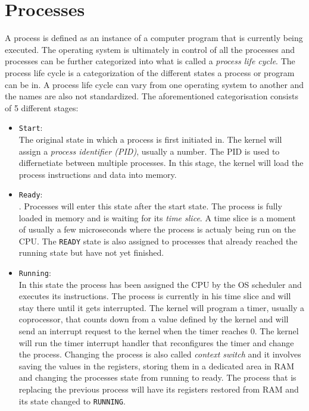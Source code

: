 \section{Processes}

A process is defined as an instance of a computer program that is currently being executed.
The operating system is ultimately in control of all the processes and 
processes can be further categorized into what is called a \textit{process life cycle}. The process life cycle is
a categorization of the different states a process or program can be in. A process life cycle can vary
from one operating system to another and the names are also not standardized. The aforementioned 
categorisation consists of 5 different stages:

\begin{itemize}
\item \texttt{Start}: \\
	The original state in which a process is first initiated in. The kernel will assign a \textit{process identifier (PID)},
	usually a number. The PID is used to differnetiate between multiple processes. In this stage, the kernel will load the
	process instructions and data into memory.
\item \texttt{Ready}: \\
.	Processes will enter this state after the start state. The process is fully loaded in memory and is waiting for its \textit{time slice}.
		A time slice is a moment of usually a few microseconds where the process is actualy being run on the CPU. The \texttt{READY} state
		is also assigned to processes that already reached the running state but have not yet finished.
\item \texttt{Running}: \\
In this state the process has been assigned the CPU by the OS scheduler and executes its instructions. The process is currently in his time slice
and will stay there until it gets interrupted. The kernel will program a timer, usually a coprocessor, that counts down from a value defined by
		the kernel and will send an interrupt request to the kernel when the timer reaches 0. The kernel will run the timer interrupt handler
		that reconfigures the timer and change the process. Changing the process is also called \textit{context switch} and it involves
		saving the values in the registers, storing them in a dedicated area in RAM and changing the processes state from running to ready.
		The process that is replacing the previous process will have its registers restored from RAM and its state changed to \texttt{RUNNING}.

\end{itemize}
